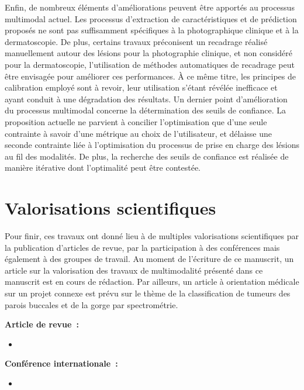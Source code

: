 Enfin, de nombreux éléments d'améliorations peuvent être apportés au processus multimodal actuel. Les processus d'extraction de caractéristiques et de prédiction proposés ne sont pas suffisamment spécifiques à la photographique clinique et à la dermatoscopie. De plus, certains travaux préconisent un recadrage réalisé manuellement autour des lésions pour la photographie clinique, et non considéré pour la dermatoscopie, l'utilisation de méthodes automatiques de recadrage peut être envisagée pour améliorer ces performances. À ce même titre, les principes de calibration employé sont à revoir, leur utilisation s'étant révélée inefficace et ayant conduit à une dégradation des résultats. Un dernier point d'amélioration du processus multimodal concerne la détermination des seuils de confiance. La proposition actuelle ne parvient à concilier l'optimisation que d'une seule contrainte à savoir d'une métrique au choix de l'utilisateur, et délaisse une seconde contrainte liée à l'optimisation du processus de prise en charge des lésions au fil des modalités. De plus, la recherche des seuils de confiance est réalisée de manière itérative dont l'optimalité peut être contestée.\par
\clearpage

\section*{Valorisations scientifiques}
Pour finir, ces travaux ont donné lieu à de multiples valorisations scientifiques par la publication d'articles de revue, par la participation à des conférences mais également à des groupes de travail. Au moment de l'écriture de ce manuscrit, un article sur la valorisation des travaux de multimodalité présenté dans ce manuscrit est en cours de rédaction. Par ailleurs, un article à orientation médicale sur un projet connexe est prévu sur le thème de la classification de tumeurs des parois buccales et de la gorge par spectrométrie.\par

\textbf{Article de revue~:}
\vspace{-0.1cm}
\begin{itemize}
    \item {}
\end{itemize}

\textbf{Conférence internationale~:}
\vspace{-0.2cm}
\begin{itemize}
    \item {}
\end{itemize}

